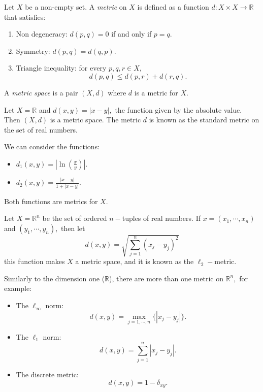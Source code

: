 \documentclass[
	fontsize=10pt, %
	twoside=false, %
	secnumdepth=1, %
]{kaobook}
\begin{document}
\begin{definition}
Let $X$ be a non-empty set. A \emph{metric} on $X$ is defined as a function $d:X\times X\to \mathbb{R}$ that satisfies:
\begin{enumerate}
\item Non degeneracy: $d(p,q)=0$ if and only if $p=q.$
\item Symmetry: $d(p,q)=d(q,p).$
\item Triangle inequality: for every $p,q,r\in X,$ $$d(p,q)\leq d(p,r)+d(r,q).$$
\end{enumerate}

A \emph{metric space} is a pair $(X,d)$ where $d$ is a metric for $X.$
\end{definition}
\begin{example}
Let $X=\mathbb{R}$ and $d(x,y)=|x-y|,$ the function given by the absolute value. Then $(X,d)$ is a metric space. The metric $d$ is known as the standard metric on the set of real numbers.

We can consider the functions:
\begin{itemize}
\item $d_1(x,y)=\left|\ln\left(\frac{x}{y}\right)\right|.$

\item $d_2(x,y)=\frac{|x-y|}{1+|x-y|}.$
\end{itemize}

Both functions are metrics for $X.$
\end{example}

\begin{example}
Let $X=\mathbb{R}^n$ be the set of ordered $n-$tuples of real numbers. If $x=(x_1,\cdots,x_n)$ and $(y_1,\cdots,y_n),$ then let $$d(x,y)=\sqrt{\sum_{j=1}^n (x_j-y_j)^2}$$ this function makes $X$ a metric space, and it is known as the $\ell_2-$metric.

Similarly to the dimension one ($\mathbb{R}$), there are more than one metric on $\mathbb{R}^n,$ for example:

\begin{itemize}
\item The $\ell_\infty$ norm: $$d(x,y)=\max_{j=1,\cdots,n} \{|x_j-y_j|\}.$$

\item The $\ell_1$ norm: $$d(x,y)=\sum_{j=1}^n |x_j-y_j|.$$

\item The discrete metric: $$d(x,y)=1-\delta_{xy}.$$
\end{itemize}
\end{example}
\end{document}
